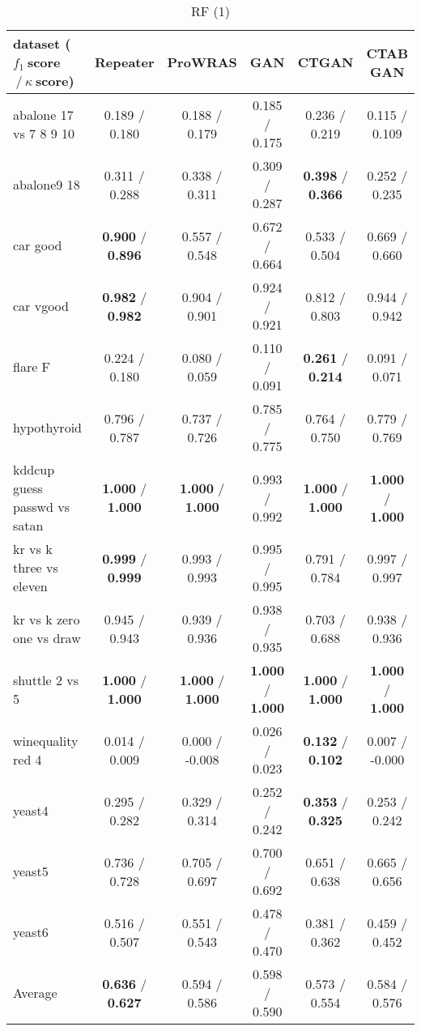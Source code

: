 \begin{table*}[ht]\scriptsize\caption{RF (1)}\label{tab:results:RF:A}\centering\tabularnewline
\begin{tabular}{l|@{\hskip3pt}c@{\hskip3pt}|@{\hskip3pt}c@{\hskip3pt}|@{\hskip3pt}c@{\hskip3pt}|@{\hskip3pt}c@{\hskip3pt}|@{\hskip3pt}c@{\hskip3pt}}\hline
\textbf{dataset ($f_1~$score$~/~\kappa~$score)} & \textbf{Repeater} & \textbf{ProWRAS} & \textbf{GAN} & \textbf{CTGAN} & \textbf{CTAB GAN}
\tabularnewline
\hline
abalone 17 vs 7 8 9 10 &  0.189  /  0.180  &  0.188  /  0.179  &  0.185  /  0.175  &  0.236  /  0.219  &  0.115  /  0.109 
\tabularnewline
abalone9 18 &  0.311  /  0.288  &  0.338  /  0.311  &  0.309  /  0.287  &  \textbf{0.398}  /  \textbf{0.366}  &  0.252  /  0.235 
\tabularnewline
car good &  \textbf{0.900}  /  \textbf{0.896}  &  0.557  /  0.548  &  0.672  /  0.664  &  0.533  /  0.504  &  0.669  /  0.660 
\tabularnewline
car vgood &  \textbf{0.982}  /  \textbf{0.982}  &  0.904  /  0.901  &  0.924  /  0.921  &  0.812  /  0.803  &  0.944  /  0.942 
\tabularnewline
flare F &  0.224  /  0.180  &  0.080  /  0.059  &  0.110  /  0.091  &  \textbf{0.261}  /  \textbf{0.214}  &  0.091  /  0.071 
\tabularnewline
hypothyroid &  0.796  /  0.787  &  0.737  /  0.726  &  0.785  /  0.775  &  0.764  /  0.750  &  0.779  /  0.769 
\tabularnewline
kddcup guess passwd vs satan &  \textbf{1.000}  /  \textbf{1.000}  &  \textbf{1.000}  /  \textbf{1.000}  &  0.993  /  0.992  &  \textbf{1.000}  /  \textbf{1.000}  &  \textbf{1.000}  /  \textbf{1.000} 
\tabularnewline
kr vs k three vs eleven &  \textbf{0.999}  /  \textbf{0.999}  &  0.993  /  0.993  &  0.995  /  0.995  &  0.791  /  0.784  &  0.997  /  0.997 
\tabularnewline
kr vs k zero one vs draw &  0.945  /  0.943  &  0.939  /  0.936  &  0.938  /  0.935  &  0.703  /  0.688  &  0.938  /  0.936 
\tabularnewline
shuttle 2 vs 5 &  \textbf{1.000}  /  \textbf{1.000}  &  \textbf{1.000}  /  \textbf{1.000}  &  \textbf{1.000}  /  \textbf{1.000}  &  \textbf{1.000}  /  \textbf{1.000}  &  \textbf{1.000}  /  \textbf{1.000} 
\tabularnewline
winequality red 4 &  0.014  /  0.009  &  0.000  /  -0.008  &  0.026  /  0.023  &  \textbf{0.132}  /  \textbf{0.102}  &  0.007  /  -0.000 
\tabularnewline
yeast4 &  0.295  /  0.282  &  0.329  /  0.314  &  0.252  /  0.242  &  \textbf{0.353}  /  \textbf{0.325}  &  0.253  /  0.242 
\tabularnewline
yeast5 &  0.736  /  0.728  &  0.705  /  0.697  &  0.700  /  0.692  &  0.651  /  0.638  &  0.665  /  0.656 
\tabularnewline
yeast6 &  0.516  /  0.507  &  0.551  /  0.543  &  0.478  /  0.470  &  0.381  /  0.362  &  0.459  /  0.452 
\tabularnewline
\hline Average &  \textbf{0.636}  /  \textbf{0.627}  &  0.594  /  0.586  &  0.598  /  0.590  &  0.573  /  0.554  &  0.584  /  0.576 
\tabularnewline
\hline\end{tabular}\end{table*}


